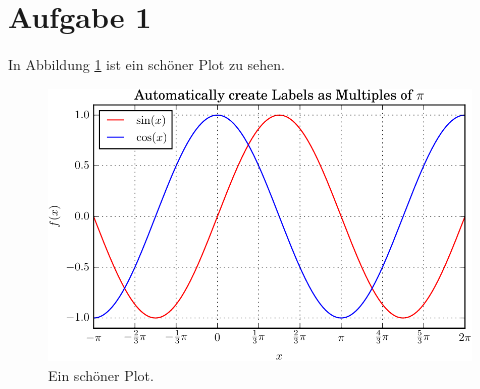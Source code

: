\documentclass{scrartcl}
\begin{document}
\section*{Aufgabe 1}
In Abbildung \ref{fig:plot1} ist ein schöner Plot zu sehen.
\blindtext
\begin{figure}
  \centering
  \includegraphics[scale=1]{plot1.pdf}
  \caption{Ein schöner Plot.}
  \label{fig:plot1}
\end{figure}
\blindtext
\end{document}
